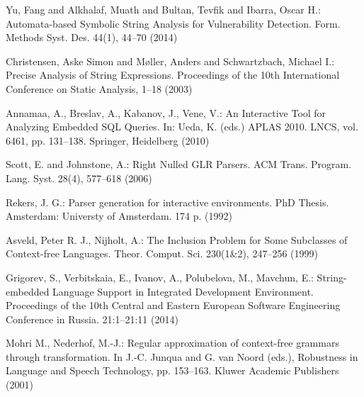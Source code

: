\documentclass{llncs}
\begin{document}
 


%
%
\begin{thebibliography}{}
%
Yu, Fang and Alkhalaf, Muath and Bultan, Tevfik and Ibarra, Oscar H.:
Automata-based Symbolic String Analysis for Vulnerability Detection.
Form. Methods Syst. Des. 44(1), 44--70 (2014)

Christensen, Aske Simon and M{\o}ller, Anders and Schwartzbach, Michael I.:
Precise Analysis of String Expressions.
Proceedings of the 10th International Conference on Static Analysis, 1--18 (2003)

Annamaa, A., Breslav, A., Kabanov, J., Vene, V.:
An Interactive Tool for Analyzing Embedded SQL Queries.
In: Ueda, K. (eds.) APLAS 2010. LNCS, vol. 6461, pp. 131--138. Springer, Heidelberg (2010)

Scott, E. and Johnstone, A.:
Right Nulled GLR Parsers.
ACM Trans. Program. Lang. Syst. 28(4), 577--618 (2006)

Rekers, J. G.:
Parser generation for interactive environments.
PhD Thesis. Amsterdam: Universty of Amsterdam. 174 p. (1992)

Asveld, Peter R. J., Nijholt, A.:
The Inclusion Problem for Some Subclasses of Context-free Languages.
Theor. Comput. Sci. 230(1\&2), 247--256 (1999)

Grigorev, S., Verbitskaia, E., Ivanov, A., Polubelova, M., Mavchun, E.:
String-embedded Language Support in Integrated Development Environment.
Proceedings of the 10th Central and Eastern European Software Engineering Conference in Russia. 21:1--21:11 (2014)

Mohri M., Nederhof, M.-J.:
Regular approximation of context-free grammars through transformation.
 In J.-C. Junqua and G. van Noord (eds.), Robustness in Language and Speech Technology, pp. 153--163. Kluwer Academic Publishers (2001)


\end{thebibliography}
\clearpage
\end{document}
